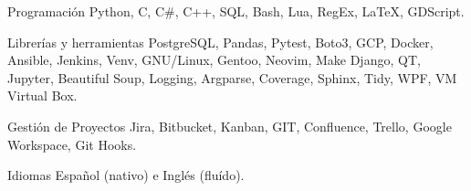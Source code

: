 

\begin{cvskills}

  \cvskill
    {Programación} %
    {Python, C, C\#, C++, SQL, Bash, Lua, RegEx, LaTeX, GDScript.} %

  \cvskill
    {Librerías y herramientas}
    {PostgreSQL, Pandas, Pytest, Boto3, GCP, Docker, Ansible, Jenkins, Venv, GNU/Linux, Gentoo, Neovim, Make}
  \cvskill
    {}
    {Django, QT, Jupyter, Beautiful Soup, Logging, Argparse, Coverage, Sphinx, Tidy, WPF, VM Virtual Box.}

  \cvskill
    {Gestión de Proyectos}
    {Jira, Bitbucket, Kanban, GIT, Confluence, Trello, Google Workspace, Git Hooks.}

  \cvskill
    {Idiomas}
    {Español (nativo) e Inglés (fluído).}


\end{cvskills}
